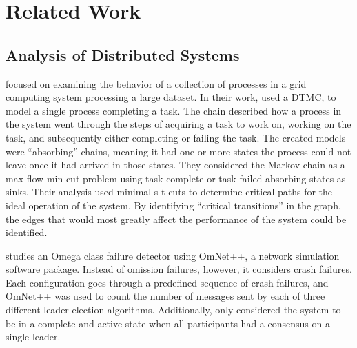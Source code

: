 

\chapter{Related Work}

\section{Analysis of Distributed Systems}

\cite{markov-distributed} focused on examining the behavior of a collection of processes in a grid computing system processing a large dataset.
In their work, used a \ac{DTMC}, to model a single process completing a task.
The chain described how a process in the system went through the steps of acquiring a task to work on, working on the task, and subsequently either completing or failing the task.
The created models were ``absorbing'' chains, meaning it had one or more states the process could not leave once it had arrived in those states.
They considered the Markov chain as a max-flow min-cut problem using task complete or task failed absorbing states as sinks.
Their analysis used minimal s-t cuts to determine critical paths for the ideal operation of the system.
By identifying ``critical transitions'' in the graph, the edges that would most greatly affect the performance of the system could be identified.

\cite{LEADERELECTIONEVAL} studies an Omega class failure detector using OmNet++\cite{OMNET}, a network simulation software package.
Instead of omission failures, however, it considers crash failures.
Each configuration goes through a predefined sequence of crash failures, and OmNet++ was used to count the number of messages sent by each of three different leader election algorithms.
Additionally, \cite{LEADERELECTIONEVAL} only considered the system to be in a complete and active state when all participants had a consensus on a single leader.

